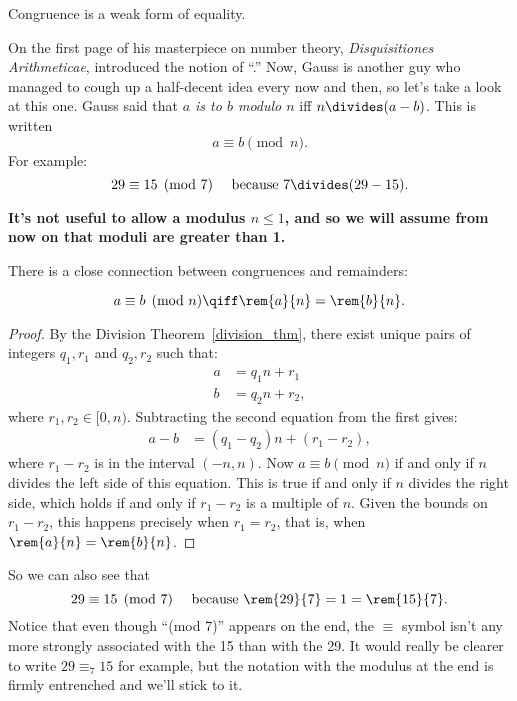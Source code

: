 \begin{editingnotes}
Congruence is a weak form of equality.
\end{editingnotes}

On the first page of his masterpiece on number theory,
\emph{Disquisitiones Arithmeticae},  introduced the notion
of ``.''  Now, Gauss is another guy who managed to
cough up a half-decent idea every now and then, so let's take a look
at this one.  Gauss said that \emph{$a$ is  to $b$
  modulo $n$}  iff $n \divides (a - b)$.
This is written 
\[
a \equiv b \pmod{n}.
\]
For example:
\[
29 \equiv 15 \pmod{7} \quad\text{ because } 7 \divides (29 - 15).
\]

\textbf{It's not useful to allow a modulus $n \leq 1$, and so we will
  assume from now on that moduli are greater than 1.}

There is a close connection between congruences and remainders:
\begin{lemma}[Remainder]\label{lem:conrem}
\[
a \equiv b \pmod{n} \qiff \rem{a}{n} = \rem{b}{n}.
\]
\end{lemma}

\begin{proof}
By the Division Theorem~\ref{division_thm}, there exist unique pairs
of integers $q_1, r_1$ and $q_2, r_2$ such that:
\begin{align*}
a & = q_1 n + r_1\\
b & = q_2 n + r_2,
\end{align*}
where $r_1,r_2 \in [0,n)$.  Subtracting the second equation from the
  first gives:
\begin{align*}
a - b & = (q_1 - q_2) n + (r_1 - r_2),
\end{align*}
where $r_1 - r_2$ is in the interval $(-n,n)$.  Now $a \equiv b
\pmod{n}$ if and only if $n$ divides the left side of this equation.
This is true if and only if $n$ divides the right side, which holds if
and only if $r_1 - r_2$ is a multiple of $n$.  Given the bounds on
$r_1 - r_2$, this happens precisely when $r_1 = r_2$, that is, when
$\rem{a}{n} = \rem{b}{n}$.
\end{proof}

So we can also see that
\[
29 \equiv 15 \pmod{7} \quad\text{ because } \rem{29}{7} = 1 =
\rem{15}{7}.
\]
Notice that even though ``(mod 7)'' appears on the end, the $\equiv$
symbol isn't any more strongly associated with the 15 than with the
29.  It would really be clearer to write $29 \equiv_7 15$ for example,
but the notation with the modulus at the end is firmly entrenched and
we'll stick to it.

